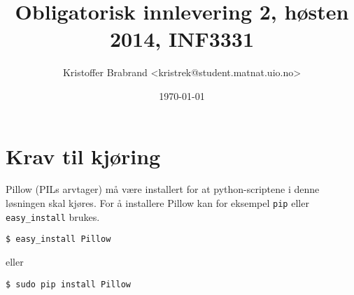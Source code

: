 \documentclass{article}
\title{Obligatorisk innlevering 2, høsten 2014, INF3331}
\author{Kristoffer Brabrand <kristrek@student.matnat.uio.no>}
\date{\today}
\begin{document}
\maketitle

\section*{Krav til kjøring}
Pillow (PILs arvtager) må være installert for at python-scriptene i denne løsningen skal kjøres. For å installere Pillow kan for eksempel \verb;pip; eller \verb;easy_install; brukes.

\begin{Verbatim}[fontsize=\small, frame=single]
$ easy_install Pillow
\end{Verbatim}

eller

\begin{Verbatim}[fontsize=\small, frame=single]
$ sudo pip install Pillow
\end{Verbatim}
\end{document}
